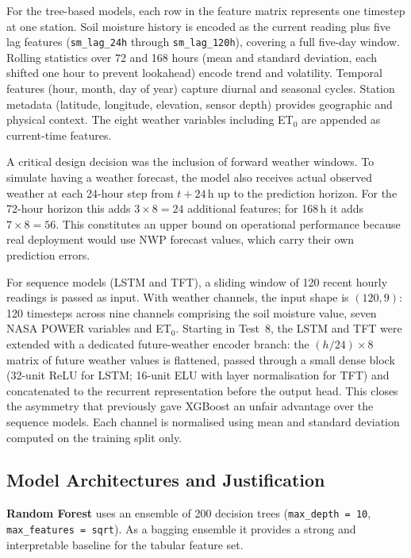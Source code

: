 \documentclass[12pt, a4paper]{article}
\begin{document}
For the tree-based models, each row in the feature matrix represents one
timestep at one station. Soil moisture history is encoded as the current
reading plus five lag features (\texttt{sm\_lag\_24h} through
\texttt{sm\_lag\_120h}), covering a full five-day window. Rolling statistics
over 72 and 168 hours (mean and standard deviation, each shifted one hour to
prevent lookahead) encode trend and volatility. Temporal features (hour, month,
day of year) capture diurnal and seasonal cycles. Station metadata (latitude,
longitude, elevation, sensor depth) provides geographic and physical context.
The eight weather variables including ET$_0$ are appended as current-time
features.

A critical design decision was the inclusion of forward weather windows. To
simulate having a weather forecast, the model also receives actual observed
weather at each 24-hour step from $t+24$\,h up to the prediction horizon.
For the 72-hour horizon this adds $3 \times 8 = 24$ additional features; for
168\,h it adds $7 \times 8 = 56$. This constitutes an upper bound on
operational performance because real deployment would use NWP forecast values,
which carry their own prediction errors.

For sequence models (LSTM and TFT), a sliding window of 120 recent hourly
readings is passed as input. With weather channels, the input shape is
$(120, 9)$: 120 timesteps across nine channels comprising the soil moisture
value, seven NASA POWER variables and ET$_0$. Starting in Test~8, the LSTM
and TFT were extended with a dedicated future-weather encoder branch: the
$(h/24) \times 8$ matrix of future weather values is flattened, passed through
a small dense block (32-unit ReLU for LSTM; 16-unit ELU with layer
normalisation for TFT) and concatenated to the recurrent representation before
the output head. This closes the asymmetry that previously gave XGBoost an
unfair advantage over the sequence models. Each channel is normalised using
mean and standard deviation computed on the training split only.

\subsection{Model Architectures and Justification}

\textbf{Random Forest} uses an ensemble of 200 decision trees
(\texttt{max\_depth = 10}, \texttt{max\_features = sqrt}). As a bagging
ensemble it provides a strong and interpretable baseline for the tabular
feature set.
\end{document}
